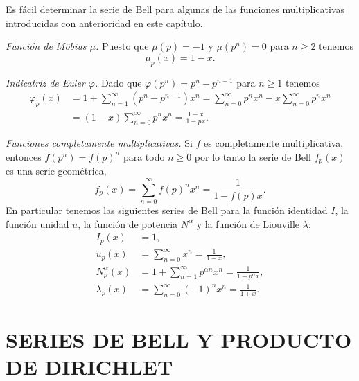 \documentclass[12pt,a4paper]{book}
\begin{document}
    Es fácil determinar la serie de Bell para algunas de las funciones multiplicativas
    introducidas con anterioridad en este capítulo.

    \begin{ejemplo}
        \textit{Función de Möbius $\mu$.} Puesto que $\mu(p)=-1$ y $\mu(p^n)=0$ para
        $n\geq2$ tenemos
        \begin{equation*}
            \mu_p(x)=1-x.
        \end{equation*}
    \end{ejemplo}

    \begin{ejemplo}
        \textit{Indicatriz de Euler $\varphi$.} Dado que $\varphi(p^n)=p^n-p^{n-1}$ para
        $n\geq1$ tenemos
        \begin{align*}
            \varphi_p(x)&=1+\sum_{n=1}^{\infty}(p^n-p^{n-1})x^n
            =\sum_{n=0}^{\infty}p^nx^n-x\sum_{n=0}^{\infty}p^nx^n\\
            &=(1-x)\sum_{n=0}^{\infty}p^nx^n=\frac{1-x}{1-px}.
        \end{align*}
    \end{ejemplo}

    \begin{ejemplo}
        \textit{Funciones completamente multiplicativas.} Si $f$ es completamente
        multiplicativa, entonces $f(p^n)=f(p)^n$ para todo $n\geq0$ por lo tanto la serie
        de Bell $f_p(x)$ es una serie geométrica,
        \begin{equation*}
            f_p(x)=\sum_{n=0}^{\infty}f(p)^nx^n=\frac{1}{1-f(p)x}.
        \end{equation*}
        En particular tenemos las siguientes series de Bell para la función identidad $I$,
        la función unidad $u$, la función de potencia $N^\alpha$ y la función de Liouville
        $\lambda$:
        \begin{align*}
            I_p(x)&=1,\\
            u_p(x)&=\sum_{n=0}^{\infty}x^n=\frac{1}{1-x},\\
            N^\alpha_p(x)&=1+\sum_{n=1}^{\infty}p^{\alpha n}x^n=\frac{1}{1-p^\alpha x},\\
            \lambda_p(x)&=\sum_{n=0}^{\infty}(-1)^nx^n=\frac{1}{1+x}.
        \end{align*}
    \end{ejemplo}

    \section{SERIES DE BELL Y PRODUCTO DE DIRICHLET}
\end{document}
